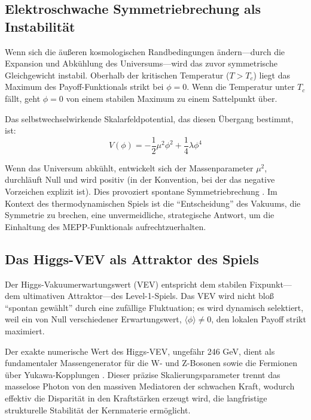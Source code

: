 \documentclass[12pt,a4paper]{article}
\theoremstyle{remark}
\begin{document}
\subsection{Elektroschwache Symmetriebrechung als Instabilit\"at}

Wenn sich die \"au\ss{}eren kosmologischen Randbedingungen \"andern---durch die Expansion und Abk\"uhlung des Universums---wird das zuvor symmetrische Gleichgewicht instabil. Oberhalb der kritischen Temperatur ($T > T_c$) liegt das Maximum des Payoff-Funktionals strikt bei $\phi = 0$. Wenn die Temperatur unter $T_c$ f\"allt, geht $\phi = 0$ von einem stabilen Maximum zu einem Sattelpunkt \"uber.

Das selbstwechselwirkende Skalarfeldpotential, das diesen \"Ubergang bestimmt, ist:
\begin{equation}
V(\phi) = -\frac{1}{2}\mu^2 \phi^2 + \frac{1}{4}\lambda \phi^4
\end{equation}

Wenn das Universum abk\"uhlt, entwickelt sich der Massenparameter $\mu^2$, durchl\"auft Null und wird positiv (in der Konvention, bei der das negative Vorzeichen explizit ist). Dies provoziert spontane Symmetriebrechung \citep{HiggsVEV2024}. Im Kontext des thermodynamischen Spiels ist die ``Entscheidung'' des Vakuums, die Symmetrie zu brechen, eine unvermeidliche, strategische Antwort, um die Einhaltung des MEPP-Funktionals aufrechtzuerhalten.

\subsection{Das Higgs-VEV als Attraktor des Spiels}

Der Higgs-Vakuumerwartungswert (VEV) entspricht dem stabilen Fixpunkt---dem ultimativen Attraktor---des Level-1-Spiels. Das VEV wird nicht blo\ss{} ``spontan gew\"ahlt'' durch eine zuf\"allige Fluktuation; es wird dynamisch selektiert, weil ein von Null verschiedener Erwartungswert, $\langle\phi\rangle \neq 0$, den lokalen Payoff strikt maximiert.

Der exakte numerische Wert des Higgs-VEV, ungef\"ahr 246 GeV, dient als fundamentaler Massengenerator f\"ur die W- und Z-Bosonen sowie die Fermionen \"uber Yukawa-Kopplungen \citep{HiggsVEV}. Dieser pr\"azise Skalierungsparameter trennt das masselose Photon von den massiven Mediatoren der schwachen Kraft, wodurch effektiv die Disparit\"at in den Kraftst\"arken erzeugt wird, die langfristige strukturelle Stabilit\"at der Kernmaterie erm\"oglicht.
\end{document}
